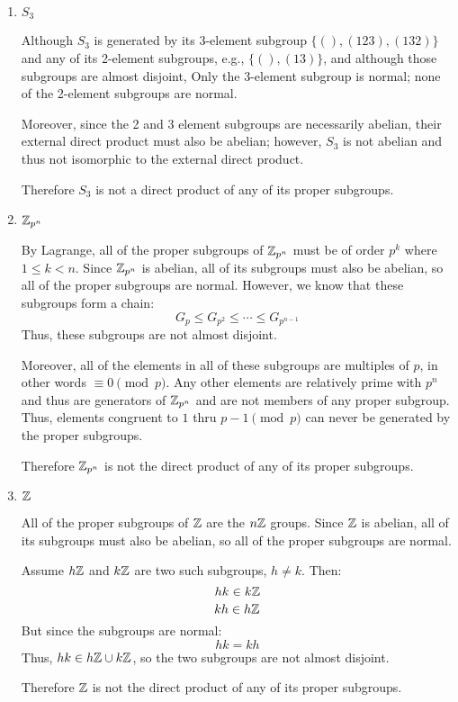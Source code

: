 \documentclass[letterpaper,12pt,fleqn]{article}
\begin{document}
\begin{enumerate}[label={\alph*)}]
\item $S_3$

  Although $S_3$ is generated by its 3-element subgroup $\{(),(123),(132)\}$
  and any of its 2-element subgroups, e.g., $\{(),(13)\}$, and although those
  subgroups are almost disjoint, Only the 3-element subgroup is normal; none
  of the 2-element subgroups are normal.

  Moreover, since the 2 and 3 element subgroups are necessarily abelian, their
  external direct product must also be abelian; however, $S_3$ is not abelian
  and thus not isomorphic to the external direct product.

  Therefore $S_3$ is not a direct product of any of its proper subgroups.

\newcommand{\zpn}{\Z_{p^n}}
  
\item $\zpn$

  By Lagrange, all of the proper subgroups of $\zpn$ must be of order $p^k$
  where $1\le k<n$. Since $\zpn$ is abelian, all of its subgroups must also be
  abelian, so all of the proper subgroups are normal. However, we know that
  these subgroups form a chain:
  \[G_p\le G_{p^2}\le\cdots\le G_{p^{n-1}}\]
  Thus, these subgroups are not almost disjoint.
  
  Moreover, all of the elements in all of these subgroups are multiples of
  $p$, in other words $\equiv0\pmod p$. Any other elements are relatively
  prime with $p^n$ and thus are generators of $\zpn$ and are not members of
  any proper subgroup. Thus, elements congruent to $1$ thru $p-1\pmod p$ can
  never be generated by the proper subgroups.

  Therefore $\zpn$ is not the direct product of any of its proper subgroups.

\item $\mathbb{Z}$

  All of the proper subgroups of $\mathbb{Z}$ are the $n\mathbb{Z}$ groups. Since $\mathbb{Z}$ is
  abelian, all of its subgroups must also be abelian, so all of the proper
  subgroups are normal.

  Assume $h\mathbb{Z}$ and $k\mathbb{Z}$ are two such subgroups, $h\ne k$. Then:
  \[hk\in k\mathbb{Z}\]
  \[kh\in h\mathbb{Z}\]
  But since the subgroups are normal:
  \[hk=kh\]
  Thus, $hk\in h\mathbb{Z}\cup k\mathbb{Z}$, so the two subgroups are not almost disjoint.

  Therefore $\mathbb{Z}$ is not the direct product of any of its proper subgroups.
\end{enumerate}
\end{document}

